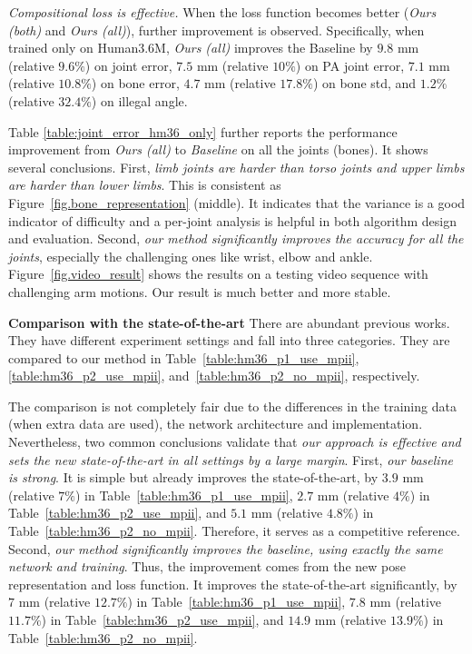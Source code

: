 \documentclass[10pt,twocolumn,letterpaper]{article}
\begin{document}
\emph{Compositional loss is effective.} When the loss function becomes better (\emph{Ours (both)} and \emph{Ours (all)}), further improvement is observed. Specifically, when trained only on Human3.6M, \emph{Ours (all)} improves the Baseline by $9.8$ mm (relative $9.6\%$) on joint error, $7.5$ mm (relative $10\%$) on PA joint error, $7.1$ mm (relative $10.8\%$) on bone error, $4.7$ mm (relative $17.8\%$) on bone std, and $1.2\%$ (relative $32.4\%$) on illegal angle.

Table \ref{table:joint_error_hm36_only} further reports the performance improvement from \emph{Ours (all)} to \emph{Baseline} on all the joints (bones). It shows several conclusions. First, \emph{limb joints are harder than torso joints and upper limbs are harder than lower limbs}. This is consistent as Figure~\ref{fig.bone_representation} (middle). It indicates that the variance is a good indicator of difficulty and a per-joint analysis is helpful in both algorithm design and evaluation. Second, \emph{our method significantly improves the accuracy for all the joints}, especially the challenging ones like wrist, elbow and ankle. Figure~\ref{fig.video_result} shows the results on a testing video sequence with challenging arm motions. Our result is much better and more stable.

\textbf{Comparison with the state-of-the-art}
There are abundant previous works. They have different experiment settings and fall into three categories. They are compared to our method in Table~\ref{table:hm36_p1_use_mpii}, \ref{table:hm36_p2_use_mpii}, and~\ref{table:hm36_p2_no_mpii}, respectively. 


The comparison is not completely fair due to the differences in the training data (when extra data are used), the network architecture and implementation. Nevertheless, two common conclusions validate that \emph{our approach is effective and sets the new state-of-the-art in all settings by a large margin}. First, \emph{our baseline is strong}. It is simple but already improves the state-of-the-art, by $3.9$ mm (relative $7\%$) in Table~\ref{table:hm36_p1_use_mpii}, $2.7$ mm (relative $4\%$) in Table~\ref{table:hm36_p2_use_mpii}, and $5.1$ mm (relative $4.8\%$) in Table~\ref{table:hm36_p2_no_mpii}. Therefore, it serves as a competitive reference. Second, \emph{our method significantly improves the baseline, using exactly the same network and training}. Thus, the improvement comes from the new pose representation and loss function. It improves the state-of-the-art significantly, by $7$ mm (relative $12.7\%$) in Table~\ref{table:hm36_p1_use_mpii}, $7.8$ mm (relative $11.7\%$) in Table~\ref{table:hm36_p2_use_mpii}, and $14.9$ mm (relative $13.9\%$) in Table~\ref{table:hm36_p2_no_mpii}. 
\end{document}
